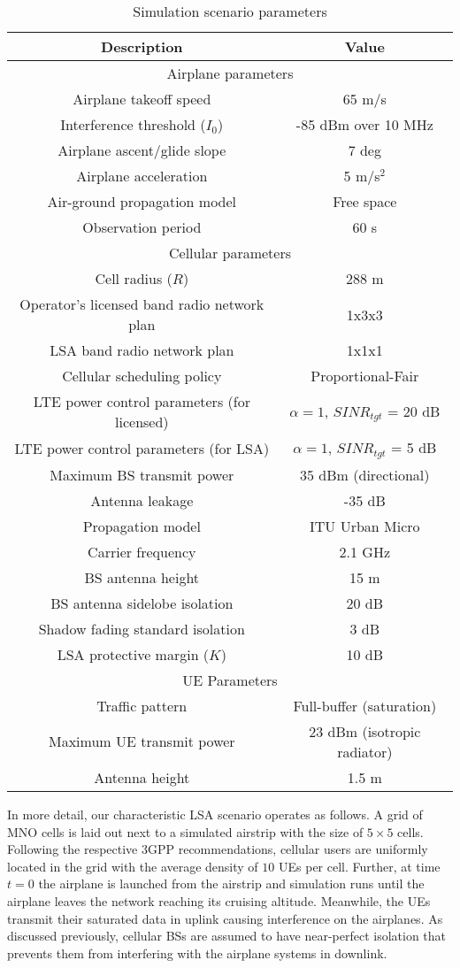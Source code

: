 \documentclass[journal]{IEEEtran}
\begin{document}
\begin{table}[!ht]
\centering
\caption{Simulation scenario parameters}
{\scriptsize
\begin{tabular}{|c|c|}
\hline 
Description & Value\tabularnewline
\hline 
\hline 
\multicolumn{2}{|c|}{Airplane parameters}\tabularnewline
\hline 
Airplane takeoff speed & 65 m/s\tabularnewline
\hline 
Interference threshold ($I_{0}$) & -85 dBm over 10 MHz\tabularnewline
\hline 
Airplane ascent/glide slope & 7 deg\tabularnewline
\hline 
Airplane acceleration & 5 m/s$^{2}$\tabularnewline
\hline 
Air-ground propagation model & Free space\tabularnewline
\hline 
Observation period & 60 s\tabularnewline
\hline 
\multicolumn{2}{|c|}{Cellular parameters}\tabularnewline
\hline 
Cell radius ($R$) & 288 m\tabularnewline
\hline 
Operator's licensed band radio network plan & 1x3x3\tabularnewline
\hline 
LSA band radio network plan & 1x1x1\tabularnewline
\hline 
Cellular scheduling policy & Proportional-Fair\tabularnewline
\hline 
LTE power control parameters (for licensed) & $\alpha = 1$, $SINR_{tgt}$ = 20 dB\tabularnewline
\hline 
LTE power control parameters (for LSA) & $\alpha = 1$, $SINR_{tgt}$ = 5 dB\tabularnewline
\hline 
Maximum BS transmit power & 35 dBm (directional)\tabularnewline
\hline 
Antenna leakage & -35 dB\tabularnewline
\hline 
Propagation model & ITU Urban Micro\tabularnewline
\hline 
Carrier frequency & 2.1 GHz\tabularnewline
\hline 
BS antenna height & 15 m\tabularnewline
\hline 
BS antenna sidelobe isolation & 20 dB\tabularnewline
\hline 
Shadow fading standard isolation & 3 dB\tabularnewline
\hline 
LSA protective margin ($K$) & 10 dB\tabularnewline
\hline 
\multicolumn{2}{|c|}{UE Parameters}\tabularnewline
\hline 
Traffic pattern & Full-buffer (saturation)\tabularnewline
\hline 
Maximum UE transmit power & 23 dBm (isotropic radiator)\tabularnewline
\hline 
Antenna height & 1.5 m\tabularnewline
\hline 
\end{tabular}}
\vspace{-0.5cm}
\end{table}

In more detail, our characteristic LSA scenario operates as follows. A grid of MNO cells is laid out next to a simulated airstrip with the size of $5 \times 5$ cells. Following the respective 3GPP recommendations, cellular users are uniformly located in the grid with the average density of $10$ UEs per cell. Further, at time $t=0$ the airplane is launched from the airstrip and simulation runs until the airplane leaves the network reaching its cruising altitude. Meanwhile, the UEs transmit their saturated data in uplink causing interference on the airplanes. As discussed previously, cellular BSs are assumed to have near-perfect isolation that prevents them from interfering with the airplane systems in downlink.
\end{document}
